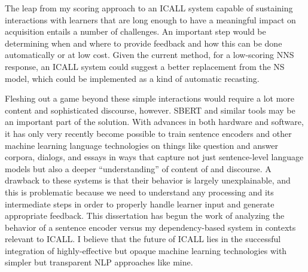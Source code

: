 The leap from my scoring approach to an ICALL system capable of sustaining interactions with learners that are long enough to have a meaningful impact on acquisition entails a number of challenges. An important step would be determining when and where to provide feedback and how this can be done automatically or at low cost. Given the current method, for a low-scoring NNS response, an ICALL system could suggest a better replacement from the NS model, which could be implemented as a kind of automatic recasting.

Fleshing out a game beyond these simple interactions would require a lot more content and sophisticated discourse, however. SBERT and similar tools may be an important part of the solution. With advances in both hardware and software, it has only very recently become possible to train sentence encoders and other machine learning language technologies on things like question and answer corpora, dialogs, and essays in ways that capture not just sentence-level language models but also a deeper ``understanding'' of content of and discourse. A drawback to these systems is that their behavior is largely unexplainable, and this is problematic because we need to understand any processing and its intermediate steps in order to properly handle learner input and generate appropriate feedback. This dissertation has begun the work of analyzing the behavior of a sentence encoder versus my dependency-based system in contexts relevant to ICALL. I believe that the future of ICALL lies in the successful integration of highly-effective but opaque machine learning technologies with simpler but transparent NLP approaches like mine. 

